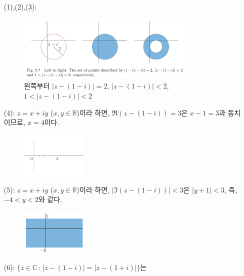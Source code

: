 \begin{itemize}
\item[(1),(2),(3):] \
\begin{figure}[h!]
\begin{center}
\includegraphics[width=0.8\textwidth]{./Solution/figs/fig-5-7}
\end{center}
\caption{왼쪽부터 $|z-(1-i)|=2$, $|z-(1-i)|<2$,
$1<|z-(1-i)|<2$}
\label{fig-5-7}
\end{figure}
\item[(4):] $z=x+iy$ ($x,y\in\mathbb R$)이라 하면,
$\Re(z-(1-i))=3$은 $x-1=3$과 동치이므로, $x=4$이다.
\begin{figure}[h!]
\begin{center}
\includegraphics[width=0.3\textwidth]{./Solution/figs/fig-s-0-2}
\end{center}
\end{figure}
\item[(5):] $z=x+iy$ ($x,y\in\mathbb R$)이라 하면,
$|\Im(z-(1-i))|<3$은 $|y+1|<3$, 즉, $-4<y<2$와 같다.
\begin{figure}[h!]
\begin{center}
\includegraphics[width=0.3\textwidth]{./Solution/figs/fig-s-0-3}
\end{center}
\end{figure}
\item[(6):] $\{ z\in\mathbb C\,:\, |z-(1-i)| = |z-(1+i)|\}$는

\end{itemize}
